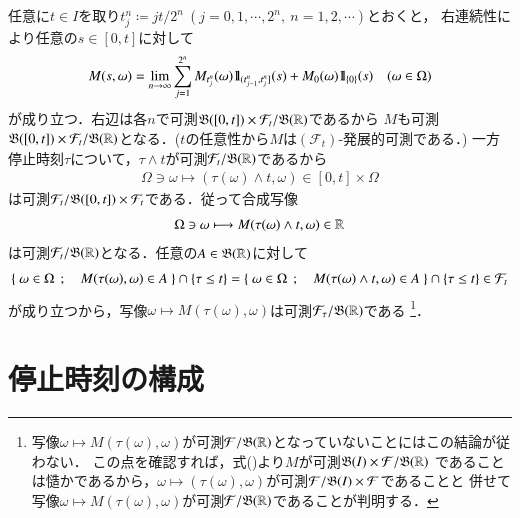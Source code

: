 	\begin{prf}
		任意に$t \in I$を取り$t_j^n \coloneqq jt/2^n\ (j=0,1,\cdots,2^n,\ n=1,2,\cdots)$とおくと，
		右連続性により任意の$s \in [0,t]$に対して
		\begin{align}
			M(s,\omega) = \lim_{n \to \infty} \sum_{j=1}^{2^n} M_{t_j^n}(\omega) \mbox{1}\hspace{-0.25em}\mbox{l}_{(t_{j-1}^n,t_j^n]}(s) + M_0(\omega) \mbox{1}\hspace{-0.25em}\mbox{l}_{\{0\}}(s) \quad (\omega \in \Omega)
			\label{eq:stopping_time_measurability}
		\end{align}
		が成り立つ．右辺は各$n$で可測$\mathfrak{B}([0,t]) \times \mathcal{F}_t/\mathfrak{B}(\mathbb{R})$であるから
		$M$も可測$\mathfrak{B}([0,t]) \times \mathcal{F}_t/\mathfrak{B}(\mathbb{R})$となる．($t$の任意性から$M$は$(\mathcal{F}_t)$-発展的可測である．)
		一方停止時刻$\tau$について，$\tau \wedge t$が可測$\mathcal{F}_t/\mathfrak{B}(\mathbb{R})$であるから
		\begin{align}
			\Omega \ni \omega \longmapsto (\tau(\omega) \wedge t, \omega) \in [0,t] \times \Omega
		\end{align}
		は可測$\mathcal{F}_t/\mathfrak{B}([0,t]) \times \mathcal{F}_t$である．従って合成写像
		\begin{align}
			\Omega \ni \omega \longmapsto M(\tau(\omega) \wedge t,\omega) \in \mathbb{R}
		\end{align}
		は可測$\mathcal{F}_t/\mathfrak{B}(\mathbb{R})$となる．任意の$A \in \mathfrak{B}(\mathbb{R})$に対して
		\begin{align}
			\left\{\ \omega \in \Omega\ \, ; \quad M(\tau(\omega),\omega) \in A\ \right\} \cap \left\{ \tau \leq t \right\}
			= \left\{\ \omega \in \Omega\ \, ; \quad M(\tau(\omega) \wedge t,\omega) \in A\ \right\} \cap \left\{ \tau \leq t \right\}
			\in \mathcal{F}_t
		\end{align}
		が成り立つから，写像$\omega \longmapsto M(\tau(\omega),\omega)$は可測$\mathcal{F}_\tau/\mathfrak{B}(\mathbb{R})$である
		\footnote{
			写像$\omega \longmapsto M(\tau(\omega),\omega)$が可測$\mathcal{F}/\mathfrak{B}(\mathbb{R})$となっていないことにはこの結論が従わない．
			この点を確認すれば，式()より$M$が可測$\mathfrak{B}(I) \times \mathcal{F}/\mathfrak{B}(\mathbb{R})$
			であることは慥かであるから，$\omega \longmapsto (\tau(\omega),\omega)$が可測$\mathcal{F}/\mathfrak{B}(I)\times\mathcal{F}$であることと
			併せて写像$\omega \longmapsto M(\tau(\omega),\omega)$が可測$\mathcal{F}/\mathfrak{B}(\mathbb{R})$であることが判明する．
		}．
		\QED
	\end{prf}

\section{停止時刻の構成}

